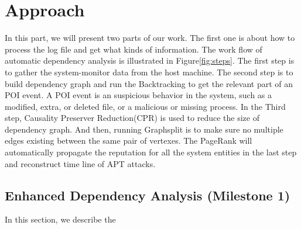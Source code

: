 \section{Approach}
In this part, we will present two parts of our work. The first one is about how to process the log file and get what kinds of information. The work flow of automatic dependency analysis is illustrated in Figure\ref{fig:steps}. The first step is to gather the system-monitor data from the host machine. The second step is to build dependency graph and run the Backtracking to get the relevant part of an POI event\cite{xu2016high}. A POI event is an suspicious behavior in the system, such as a modified, extra, or deleted file, or a malicious or missing process. In the Third step, 
Causality Preserver Reduction(CPR)  is used to reduce the size of dependency graph. And then, running Graphsplit is to make sure no multiple edges existing between the same pair of vertexes. The PageRank will automatically propagate the reputation for all the system entities in the last step and reconstruct time line of APT attacks.


\subsection{Enhanced Dependency Analysis (Milestone 1)}
In this section, we describe the 


